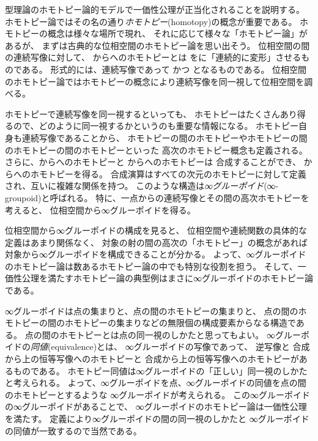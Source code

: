 \documentclass[index]{subfiles}
\begin{document}

型理論のホモトピー論的モデルで一価性公理が正当化されることを説明する。
ホモトピー論ではその名の通り\emph{ホモトピー}(homotopy)の概念が重要である。
ホモトピーの概念は様々な場所で現れ、
それに応じて様々な「ホモトピー論」があるが、
まずは古典的な位相空間のホモトピー論を思い出そう。
位相空間の間の連続写像に対して、
からへのホモトピーとは
をに「連続的に変形」させるものである。
形式的には、連続写像であって
かつ
となるものである。
位相空間のホモトピー論ではホモトピーの概念により連続写像を同一視して位相空間を調べる。

ホモトピーで連続写像を同一視するといっても、
ホモトピーはたくさんあり得るので、どのように同一視するかというのも重要な情報になる。
ホモトピー自身も連続写像であることから、
ホモトピーの間のホモトピーやホモトピーの間のホモトピーの間のホモトピーといった
高次のホモトピー概念も定義される。
さらに、からへのホモトピーと
からへのホモトピーは
合成することができ、
からへのホモトピーを得る。
合成演算はすべての次元のホモトピーに対して定義され、互いに複雑な関係を持つ。
このような構造は\emph{∞グルーポイド}(∞-groupoid)と呼ばれる。
特に、一点からの連続写像とその間の高次ホモトピーを考えると、
位相空間から∞グルーポイドを得る。

位相空間から∞グルーポイドの構成を見ると、
位相空間や連続関数の具体的な定義はあまり関係なく、
対象の射の間の高次の「ホモトピー」の概念があれば対象から∞グルーポイドを構成できることが分かる。
よって、∞グルーポイドのホモトピー論は数あるホモトピー論の中でも特別な役割を担う。
そして、一価性公理を満たすホモトピー論の典型例はまさに∞グルーポイドのホモトピー論である。

∞グルーポイドは点の集まりと、点の間のホモトピーの集まりと、
点の間のホモトピーの間のホモトピーの集まりなどの無限個の構成要素からなる構造である。
点の間のホモトピーとは点の同一視のしかたと思ってもよい。
∞グルーポイドの\emph{同値}(equivalence)とは、
∞グルーポイドの写像であって、
逆写像と
合成から上の恒等写像へのホモトピーと
合成から上の恒等写像へのホモトピーがあるものである。
ホモトピー同値は∞グルーポイドの「正しい」同一視のしかたと考えられる。
よって、∞グルーポイドを点、∞グルーポイドの同値を点の間のホモトピーとするような
∞グルーポイドが考えられる。
この∞グルーポイドの∞グルーポイドがあることで、
∞グルーポイドのホモトピー論は一価性公理を満たす。
定義により∞グルーポイドの間の同一視のしかたと
∞グルーポイドの同値が一致するので当然である。
\end{document}

